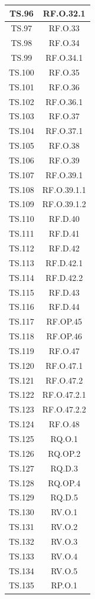 \documentclass[10pt, a4paper]{article}
\begin{document}
\begin{xltabular}{\textwidth}{|c|c|}
\hline
TS.96 & RF.O.32.1 \\
\hline
TS.97 & RF.O.33 \\
\hline
TS.98 & RF.O.34 \\
\hline
TS.99 & RF.O.34.1 \\
\hline
TS.100 & RF.O.35 \\
\hline
TS.101 & RF.O.36 \\
\hline
TS.102 & RF.O.36.1 \\
\hline
TS.103 & RF.O.37 \\
\hline
TS.104 & RF.O.37.1 \\
\hline
TS.105 & RF.O.38 \\
\hline
TS.106 & RF.O.39 \\
\hline
TS.107 & RF.O.39.1 \\
\hline
TS.108 & RF.O.39.1.1 \\
\hline
TS.109 & RF.O.39.1.2 \\
\hline
TS.110 & RF.D.40 \\
\hline
TS.111 & RF.D.41 \\
\hline
TS.112 & RF.D.42 \\
\hline
TS.113 & RF.D.42.1 \\
\hline
TS.114 & RF.D.42.2 \\
\hline
TS.115 & RF.D.43 \\
\hline
TS.116 & RF.D.44 \\
\hline
TS.117 & RF.OP.45 \\
\hline
TS.118 & RF.OP.46 \\
\hline
TS.119 & RF.O.47 \\
\hline
TS.120 & RF.O.47.1 \\
\hline
TS.121 & RF.O.47.2 \\
\hline
TS.122 & RF.O.47.2.1 \\
\hline
TS.123 & RF.O.47.2.2 \\
\hline
TS.124 & RF.O.48 \\
\hline
TS.125 & RQ.O.1 \\
\hline
TS.126 & RQ.OP.2 \\
\hline
TS.127 & RQ.D.3 \\
\hline
TS.128 & RQ.OP.4 \\
\hline
TS.129 & RQ.D.5 \\
\hline
TS.130 & RV.O.1 \\
\hline
TS.131 & RV.O.2 \\
\hline
TS.132 & RV.O.3 \\
\hline
TS.133 & RV.O.4 \\
\hline
TS.134 & RV.O.5 \\
\hline
TS.135 & RP.O.1 \\
\hline

\end{xltabular}
\end{document}
